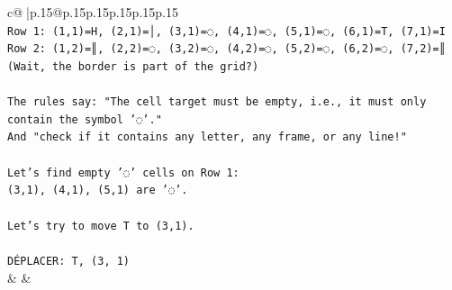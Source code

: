 \documentclass{article}
\begin{document}
{\begin{supertabular}{c@{$\;$}|p{.15\linewidth}@{}p{.15\linewidth}p{.15\linewidth}p{.15\linewidth}p{.15\linewidth}p{.15\linewidth}}
{{{\\ 
\texttt{Row 1: (1,1)=H, (2,1)=│, (3,1)=◌, (4,1)=◌, (5,1)=◌, (6,1)=T, (7,1)=I} \\
\texttt{Row 2: (1,2)=║, (2,2)=◌, (3,2)=◌, (4,2)=◌, (5,2)=◌, (6,2)=◌, (7,2)=║ (Wait, the border is part of the grid?)} \\
\\ 
\texttt{The rules say: "The cell target must be empty, i.e., it must only contain the symbol '◌'."} \\
\texttt{And "check if it contains any letter, any frame, or any line!"} \\
\\ 
\texttt{Let's find empty '◌' cells on Row 1:} \\
\texttt{(3,1), (4,1), (5,1) are '◌'.} \\
\\ 
\texttt{Let's try to move T to (3,1).} \\
\\ 
\texttt{DÉPLACER: T, (3, 1)} \\
            }
        }
    }
    & & \\ \\


\end{supertabular}}
\end{document}
